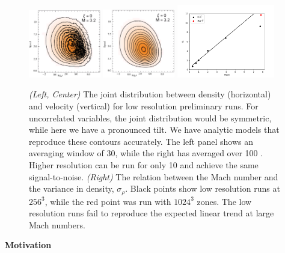 \begin{figure}[h] \begin{center}
\includegraphics[width=0.28\textwidth]{Joint1e.png}
\includegraphics[width=0.28\textwidth]{Joint2e.png}
\includegraphics[width=0.38\textwidth]{resolution.png}
\caption[ ]{\emph{(Left, Center)} The joint distribution between density
(horizontal) and velocity (vertical) for low resolution preliminary runs.  For
uncorrelated variables, the joint distribution would be symmetric, while here we
have a pronounced tilt.  We have analytic models that reproduce these contours
accurately.  The left panel shows an averaging window of 30\tdyn, while the
right has averaged over 100 \tdyn. Higher resolution can be run for only 10\tdyn
and achieve the same signal-to-noise.
\emph{(Right)}
The relation between  the Mach number and the
variance in density, $\sigma_\rho$.  Black points show low resolution runs at
$256^3$, while the red point was run with $1024^3$ zones.  The low resolution
runs fail to reproduce the expected linear trend at large Mach numbers.  
}
\label{fig.joint} \end{center} \end{figure}

\begin{Large}
\noindent\textbf{Motivation}
\end{Large}


